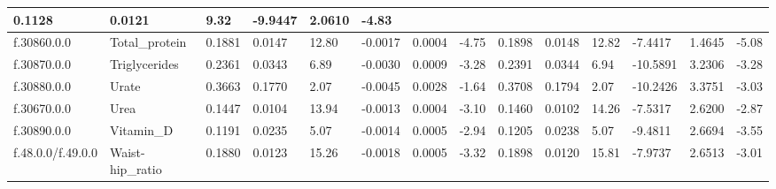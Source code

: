 \begin{longtable}{llllllllllllll}
  \multicolumn{1}{l|}{0.1128} &
  \multicolumn{1}{l|}{0.0121} &
  \multicolumn{1}{l|}{9.32} &
  \multicolumn{1}{l|}{-9.9447} &
  \multicolumn{1}{l|}{2.0610} &
  \multicolumn{1}{l|}{-4.83} \\ \hline
\multicolumn{1}{|l|}{f.30860.0.0} &
  \multicolumn{1}{l|}{Total\_protein} &
  \multicolumn{1}{l|}{0.1881} &
  \multicolumn{1}{l|}{0.0147} &
  \multicolumn{1}{l|}{12.80} &
  \multicolumn{1}{l|}{-0.0017} &
  \multicolumn{1}{l|}{0.0004} &
  \multicolumn{1}{l|}{-4.75} &
  \multicolumn{1}{l|}{0.1898} &
  \multicolumn{1}{l|}{0.0148} &
  \multicolumn{1}{l|}{12.82} &
  \multicolumn{1}{l|}{-7.4417} &
  \multicolumn{1}{l|}{1.4645} &
  \multicolumn{1}{l|}{-5.08} \\ \hline
\multicolumn{1}{|l|}{f.30870.0.0} &
  \multicolumn{1}{l|}{Triglycerides} &
  \multicolumn{1}{l|}{0.2361} &
  \multicolumn{1}{l|}{0.0343} &
  \multicolumn{1}{l|}{6.89} &
  \multicolumn{1}{l|}{-0.0030} &
  \multicolumn{1}{l|}{0.0009} &
  \multicolumn{1}{l|}{-3.28} &
  \multicolumn{1}{l|}{0.2391} &
  \multicolumn{1}{l|}{0.0344} &
  \multicolumn{1}{l|}{6.94} &
  \multicolumn{1}{l|}{-10.5891} &
  \multicolumn{1}{l|}{3.2306} &
  \multicolumn{1}{l|}{-3.28} \\ \hline
\multicolumn{1}{|l|}{f.30880.0.0} &
  \multicolumn{1}{l|}{Urate} &
  \multicolumn{1}{l|}{0.3663} &
  \multicolumn{1}{l|}{0.1770} &
  \multicolumn{1}{l|}{2.07} &
  \multicolumn{1}{l|}{-0.0045} &
  \multicolumn{1}{l|}{0.0028} &
  \multicolumn{1}{l|}{-1.64} &
  \multicolumn{1}{l|}{0.3708} &
  \multicolumn{1}{l|}{0.1794} &
  \multicolumn{1}{l|}{2.07} &
  \multicolumn{1}{l|}{-10.2426} &
  \multicolumn{1}{l|}{3.3751} &
  \multicolumn{1}{l|}{-3.03} \\ \hline
\multicolumn{1}{|l|}{f.30670.0.0} &
  \multicolumn{1}{l|}{Urea} &
  \multicolumn{1}{l|}{0.1447} &
  \multicolumn{1}{l|}{0.0104} &
  \multicolumn{1}{l|}{13.94} &
  \multicolumn{1}{l|}{-0.0013} &
  \multicolumn{1}{l|}{0.0004} &
  \multicolumn{1}{l|}{-3.10} &
  \multicolumn{1}{l|}{0.1460} &
  \multicolumn{1}{l|}{0.0102} &
  \multicolumn{1}{l|}{14.26} &
  \multicolumn{1}{l|}{-7.5317} &
  \multicolumn{1}{l|}{2.6200} &
  \multicolumn{1}{l|}{-2.87} \\ \hline
\multicolumn{1}{|l|}{f.30890.0.0} &
  \multicolumn{1}{l|}{Vitamin\_D} &
  \multicolumn{1}{l|}{0.1191} &
  \multicolumn{1}{l|}{0.0235} &
  \multicolumn{1}{l|}{5.07} &
  \multicolumn{1}{l|}{-0.0014} &
  \multicolumn{1}{l|}{0.0005} &
  \multicolumn{1}{l|}{-2.94} &
  \multicolumn{1}{l|}{0.1205} &
  \multicolumn{1}{l|}{0.0238} &
  \multicolumn{1}{l|}{5.07} &
  \multicolumn{1}{l|}{-9.4811} &
  \multicolumn{1}{l|}{2.6694} &
  \multicolumn{1}{l|}{-3.55} \\ \hline
f.48.0.0/f.49.0.0 &
  Waist-hip\_ratio &
  0.1880 &
  0.0123 &
  15.26 &
  -0.0018 &
  0.0005 &
  -3.32 &
  0.1898 &
  0.0120 &
  15.81 &
  -7.9737 &
  2.6513 &
  -3.01 \\ \hline
\end{longtable}